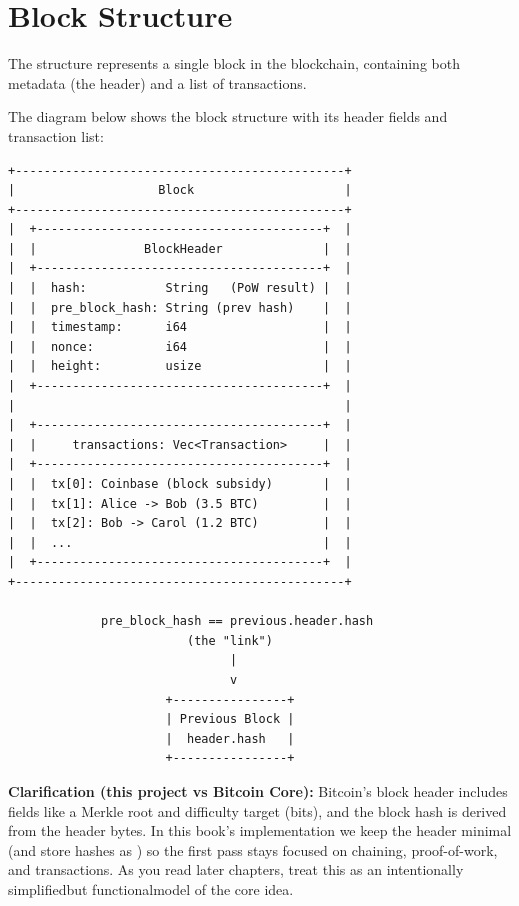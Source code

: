 \section{Block Structure}
\label{sec:ch06-block-structure}

The  structure represents a single block in the blockchain, containing both metadata (the header) and a list of transactions.

\needspace{5in}
\begin{notebox}
The diagram below shows the block structure with its header fields and transaction list:

\begin{verbatim}
+----------------------------------------------+
|                    Block                     |
+----------------------------------------------+
|  +----------------------------------------+  |
|  |               BlockHeader              |  |
|  +----------------------------------------+  |
|  |  hash:           String   (PoW result) |  |
|  |  pre_block_hash: String (prev hash)    |  |
|  |  timestamp:      i64                   |  |
|  |  nonce:          i64                   |  |
|  |  height:         usize                 |  |
|  +----------------------------------------+  |
|                                              |
|  +----------------------------------------+  |
|  |     transactions: Vec<Transaction>     |  |
|  +----------------------------------------+  |
|  |  tx[0]: Coinbase (block subsidy)       |  |
|  |  tx[1]: Alice -> Bob (3.5 BTC)         |  |
|  |  tx[2]: Bob -> Carol (1.2 BTC)         |  |
|  |  ...                                   |  |
|  +----------------------------------------+  |
+----------------------------------------------+

             pre_block_hash == previous.header.hash
                         (the "link")
                               |
                               v
                      +----------------+
                      | Previous Block |
                      |  header.hash   |
                      +----------------+
\end{verbatim}
\end{notebox}

\textbf{Clarification (this project vs Bitcoin Core):} Bitcoin's block header includes fields like a Merkle root and difficulty target (bits), and the block hash is derived from the header bytes. In this book's implementation we keep the header minimal (and store hashes as ) so the first pass stays focused on chaining, proof-of-work, and transactions. As you read later chapters, treat this as an intentionally simplified\textemdash{}but functional\textemdash{}model of the core idea.

